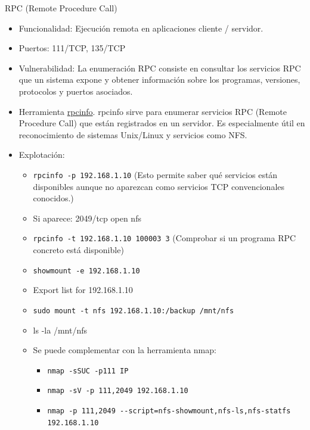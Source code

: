 \documentclass[aspectratio=169,11pt]{beamer}
\newcommand{\cmd}[1]{\texttt{#1}}
\begin{document}

\begin{frame}[allowframebreaks]{RPC (Remote Procedure Call)}
\small
  \begin{itemize}
  \item Funcionalidad: Ejecución remota en aplicaciones cliente / servidor.
  \item Puertos: 111/TCP, 135/TCP
  \item Vulnerabilidad: La enumeración RPC consiste en consultar los servicios RPC que un sistema expone y obtener información sobre los programas, versiones, protocolos y puertos asociados.
  \item Herramienta \href{https://man7.org/linux/man-pages/man8/rpcinfo.8.html}{rpcinfo}. rpcinfo sirve para enumerar servicios RPC (Remote Procedure Call) que están registrados en un servidor. Es especialmente útil en reconocimiento de sistemas Unix/Linux y servicios como NFS.
  \item Explotación:
    \begin{itemize}
    \item \cmd{rpcinfo -p 192.168.1.10} (Esto permite saber qué servicios están disponibles aunque no aparezcan como servicios TCP convencionales conocidos.)
    \item Si aparece: 2049/tcp open  nfs
    \item \cmd{rpcinfo -t 192.168.1.10 100003 3} (Comprobar si un programa RPC concreto está disponible)
    \item \cmd{showmount -e 192.168.1.10}
    \item Export list for 192.168.1.10
    \item \cmd{sudo mount -t nfs 192.168.1.10:/backup /mnt/nfs}
    \item ls -la /mnt/nfs
    \item Se puede complementar con la herramienta nmap:
          \begin{itemize}  
    \item \cmd{nmap -sSUC -p111 IP}
    \item \cmd{nmap -sV -p 111,2049 192.168.1.10}
    \item \cmd{nmap -p 111,2049 -{}-script=nfs-showmount,nfs-ls,nfs-statfs 192.168.1.10}
          \end{itemize}
    \end{itemize}
  \end{itemize}
\end{frame}
\end{document}
